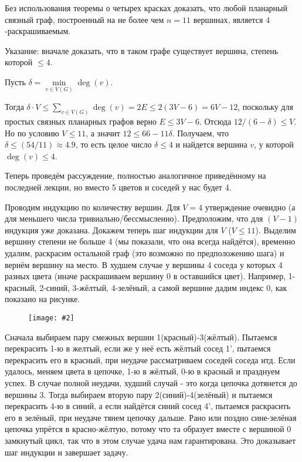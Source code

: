 \documentclass[a4paper,12pt]{article}
\numberwithin{figure}{section}
\newcommand\CenterFigure[2]{
	\begin{figure}[H]
		\centering
		\texttt{[image: \#2]}
	\end{figure}
}
\begin{document}
\begin{problem}
	Без использования теоремы о четырех красках доказать, что любой планарный связный граф, построенный на не более чем $n=11$ вершинах, является $4$-раскрашиваемым.
	
	Указание: вначале доказать, что в таком графе существует вершина, степень которой $\leqslant 4$.
\end{problem}
\begin{solution}
	Пусть $\delta = \min \limits_{v \in V(G)} \deg(v)$.
	
	Тогда $\delta \cdot V \leqslant \sum \limits_{v \in V(G)} {\deg(v)}
	      = 2E \leqslant 2(3V-6) = 6V-12$,
	поскольку для простых связных планарных графов верно $E \leqslant 3V-6$.
	Отсюда $ 12 / (6 - \delta) \leqslant V$.
	Но по условию $V \leqslant 11$, а значит $12 \leqslant 66 - 11 \delta$.
	Получаем, что $\delta \leqslant (54 / 11) \approx 4.9$,
	то есть целое число $\delta \leqslant 4$
	и найдется вершина $v$, у которой $\deg(v) \leqslant 4$.
	
	Теперь проведём рассуждение, полностью аналогичное приведённому на последней лекции, но вместо 5 цветов и соседей у нас будет 4.
	
	Проводим индукцию по количеству вершин. Для $V=4$ утверждение очевидно (а для меньшего числа тривиально/бессмысленно). Предположим, что для $(V-1)$ индукция уже доказана. Докажем теперь шаг индукции для $V$ ($V \leqslant 11$). Выделим вершину степени не больше 4 (мы показали, что она всегда найдётся), временно удалим, раскрасим остальной граф (это возможно по предположению шага) и вернём вершину на место. В худшем случае у вершины 4 соседа у которых 4 разных цвета (иначе раскрашиваем вершину 0 в оставшийся цвет). Например, 1-красный, 2-синий, 3-жёлтый, 4-зелёный, а самой вершине дадим индекс 0, как показано на рисунке.

		\CenterFigure{8cm}{stepik-lesson12347-step8-problem.png}

	Сначала выбираем пару смежных вершин 1(красный)-3(жёлтый). Пытаемся перекрасить 1-ю в желтый, если же у неё есть жёлтый сосед 1', пытаемся перекрасить его в красный, при неудаче рассматриваем соседей соседа итд. Если удалось, меняем цвета в цепочке, 1-ю в жёлтый, 0-ю в красный и празднуем успех. В случае полной неудачи, худший случай - это когда цепочка дотянется до вершины 3. Тогда выбираем вторую пару 2(синий)-4(зелёный) и пытаемся перекрасить 4-ю в синий, а если найдётся синий сосед 4', пытаемся раскрасить его в зелёный, при неудаче тянем цепочку дальше. Рано или поздно сине-зелёная цепочка упрётся в красно-жёлтую, потому что та образует вместе с вершиной 0 замкнутый цикл, так что в этом случае удача нам гарантирована. Это доказывает шаг индукции и завершает задачу.
\end{solution}
\end{document}
